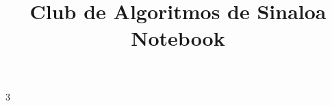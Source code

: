 \documentclass[14pt,spanish]{article}
\title{\vspace{-7ex}\Large{Club de Algoritmos de Sinaloa Notebook}}
\author{}
\date{}
\begin{document}
\maketitle
\vspace{-12ex}
\tableofcontents
\newpage
\pagestyle{fancy}

\begin{landscape}
\begin{multicols}{3}


\end{multicols}
\end{landscape}
\end{document}
